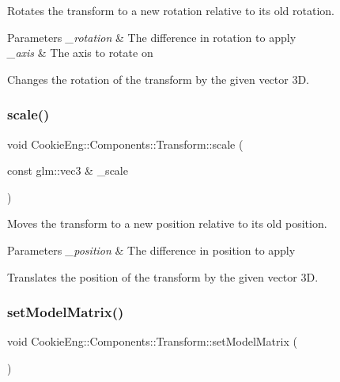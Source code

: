 Rotates the transform to a new rotation relative to its old rotation. 


\begin{DoxyParams}{Parameters}
{\em \+\_\+rotation} & The difference in rotation to apply \\
\hline
{\em \+\_\+axis} & The axis to rotate on\\
\hline
\end{DoxyParams}
Changes the rotation of the transform by the given vector 3D. \mbox{\label{class_cookie_eng_1_1_components_1_1_transform_abfb2568bd0222d8687593d253688f99f}} 
\subsubsection{\texorpdfstring{scale()}{scale()}}
{\footnotesize\ttfamily void Cookie\+Eng\+::\+Components\+::\+Transform\+::scale (\begin{DoxyParamCaption}\item[{const glm\+::vec3 \&}]{\+\_\+scale }\end{DoxyParamCaption})}



Moves the transform to a new position relative to its old position. 


\begin{DoxyParams}{Parameters}
{\em \+\_\+position} & The difference in position to apply\\
\hline
\end{DoxyParams}
Translates the position of the transform by the given vector 3D. \mbox{\label{class_cookie_eng_1_1_components_1_1_transform_a169960289f66442f692bb52c4c86478e}} 
\subsubsection{\texorpdfstring{set\+Model\+Matrix()}{setModelMatrix()}}
{\footnotesize\ttfamily void Cookie\+Eng\+::\+Components\+::\+Transform\+::set\+Model\+Matrix (\begin{DoxyParamCaption}{ }\end{DoxyParamCaption})}




